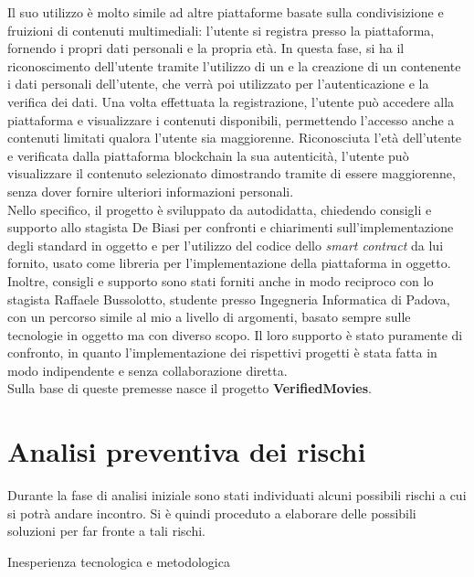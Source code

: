 Il suo utilizzo è molto simile ad altre piattaforme basate sulla condivisizione e fruizioni di contenuti multimediali:
l'utente si registra presso la piattaforma, fornendo i propri dati personali e la propria età. In questa fase, si ha il riconoscimento dell'utente
tramite l'utilizzo di un  e la creazione di un  contenente i dati personali dell'utente, che verrà poi utilizzato per l'autenticazione
e la verifica dei dati. Una volta effettuata la registrazione, l'utente può accedere alla piattaforma e visualizzare i contenuti disponibili, permettendo l'accesso
anche a contenuti limitati qualora l'utente sia maggiorenne. Riconosciuta l'età dell'utente e verificata dalla piattaforma blockchain la sua autenticità,
l'utente può visualizzare il contenuto selezionato dimostrando tramite  di essere maggiorenne, senza dover fornire ulteriori informazioni personali. \\

Nello specifico, il progetto è sviluppato da autodidatta, chiedendo consigli e supporto allo stagista De Biasi per confronti e chiarimenti sull'implementazione degli standard in oggetto
e per l'utilizzo del codice dello \textit{smart contract} da lui fornito, usato come libreria per l'implementazione della piattaforma in oggetto.
Inoltre, consigli e supporto sono stati forniti anche in modo reciproco con lo stagista Raffaele Bussolotto, studente presso Ingegneria Informatica di Padova,
con un percorso simile al mio a livello di argomenti, basato sempre sulle tecnologie in oggetto ma con diverso scopo. 
Il loro supporto è stato puramente di confronto, in quanto l'implementazione dei rispettivi progetti è stata fatta in modo indipendente e senza collaborazione diretta. \\
Sulla base di queste premesse nasce il progetto \textbf{VerifiedMovies}.

\section{Analisi preventiva dei rischi}

Durante la fase di analisi iniziale sono stati individuati alcuni possibili rischi 
a cui si potrà andare incontro. Si è quindi proceduto a elaborare delle possibili soluzioni per far fronte a tali rischi.

\begin{risk}{Inesperienza tecnologica e metodologica} 
\label{risk:inesperienza-tecnologica} 
\end{risk}

